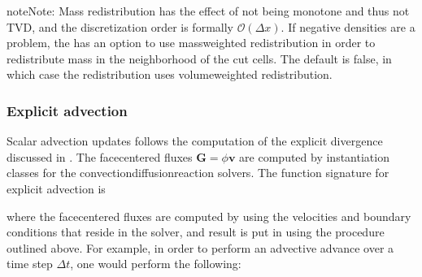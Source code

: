 \documentclass[letterpaper,10pt,english]{sphinxmanual}
\begin{document}
\begin{sphinxadmonition}{note}{Note:}
\sphinxAtStartPar
Mass redistribution has the effect of not being monotone and thus not TVD, and the discretization order is formally \(\mathcal{O}(\Delta x)\).
If negative densities are a problem, the  has an option to use mass\sphinxhyphen{}weighted redistribution in order to redistribute mass in the neighborhood of the cut cells.
The default is false, in which case the redistribution uses volume\sphinxhyphen{}weighted redistribution.
\end{sphinxadmonition}


\subsubsection{Explicit advection}
\label{\detokenize{Solvers/CDR:explicit-advection}}\label{\detokenize{Solvers/CDR:chap-explicitadvection}}
\sphinxAtStartPar
Scalar advection updates follows the computation of the explicit divergence discussed in {\hyperref[\detokenize{Solvers/CDR:chap-explicitdivergence}]{}}.
The face\sphinxhyphen{}centered fluxes \(\mathbf{G} = \phi\mathbf{v}\) are computed by instantiation classes for the convection\sphinxhyphen{}diffusion\sphinxhyphen{}reaction solvers.
The function signature for explicit advection is

\begin{sphinxVerbatim}[commandchars=\\\{\},formatcom=\scriptsize]
        
\end{sphinxVerbatim}

\sphinxAtStartPar
where the face\sphinxhyphen{}centered fluxes are computed by using the velocities and boundary conditions that reside in the solver, and result is put in  using the procedure outlined above.
For example, in order to perform an advective advance over a time step \(\Delta t\), one would perform the following:
\end{document}
